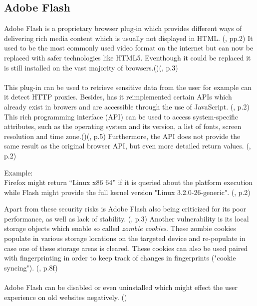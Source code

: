 \subsection{Adobe Flash}\label{adobe}
Adobe Flash is a proprietary browser plug-in which provides different ways of delivering rich media content which is usually not displayed in HTML. (\textcite{nikiforakis13}, pp.2) It used to be the most commonly used video format on the internet but can now be replaced with safer technologies like HTML5. Eventhough it could be replaced it is still installed on the vast majority of  browsers.(\textcite{web17})(\textcite{nikiforakis13}, p.3) \\\\
This plug-in can be used to retrieve sensitive data from the user for example can it detect HTTP proxies. Besides, has it reimplemented  certain APIs which already exist in browers and are accessible through the use of JavaScript. (\textcite{nikiforakis13}, p.2) This rich programming interface (API) can be used to access system-specific attributes, such as the operating system and its version, a list of fonts, screen resolution and time zone.(\textcite{amiunique})(\textcite{havens16}, p.5) Furthermore, the API does not provide the same result as the original browser API, but even more detailed return values. (\textcite{nikiforakis13}, p.2)
\begin{tcolorbox}
	Example: \\
	Firefox might return “Linux x86 64” if it is queried about the platform execution while Flash might provide the full kernel version "Linux 3.2.0-26-generic". (\textcite{nikiforakis13}, p.2)\\
\end{tcolorbox}
Apart from these security risks is Adobe Flash also being criticized for its poor performance, as well as lack of stability. (\textcite{nikiforakis13}, p.3) Another vulnerability is its local storage objects which enable so called \textit{zombie cookies}. These zombie cookies populate in various storage locations on the targeted device and re-populate in case one of these storage areas is cleared. These cookies can also be used paired with fingerprinting in order to keep track of changes in fingerprints ("cookie syncing"). (\textcite{havens16}, p.8f)\\\\
Adobe Flash can be disabled or even uninstalled which might effect the user experience on old websites negatively. (\textcite{pixel18})


